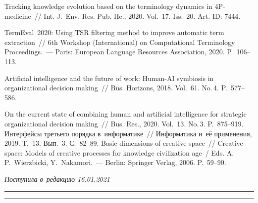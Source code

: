 \begin{multicols}{2}
{{\begin{thebibliography}{99}
 Tracking knowledge 
evolution based on the terminology dynamics in 4P-medicine~// Int. J.~Env. Res.
Pub. He., 2020. Vol.~17. Iss.~20. Art. ID: 7444.

 TermEval~2020: Using TSR filtering method to 
improve automatic term extraction~// 6th Workshop (International) on Computational 
Terminology Proceedings.~--- Paris: European Language Resources 
Association, 2020. P.~106--113.

\pagebreak

 Artificial intelligence and the future of work: Human-AI symbiosis in 
organizational decision making~// Bus. Horizons, 2018. Vol.~61. No.\,4. P.~577--586.



 On the current state of combining human and artificial 
intelligence for strategic organizational decision making~// Bus. Res., 2020. Vol.~13. 
No.\,3. P.~875--919.
 Интерфейсы третьего порядка в~информатике~// Информатика и~её 
применения, 2019. Т.~13. Вып.~3. С.~82--89.
 Basic dimensions of creative space~// Creative space: 
Models of creative processes for knowledge civilization age~/ Eds. A.\,P.~Wierzbicki, 
Y.~Nakamori.~--- Berlin: Springer Verlag, 2006. P.~59--90.
\end{thebibliography}

}
}

\end{multicols}

\vspace*{-3pt}

\hfill{\small\textit{Поступила в~редакцию 16.01.2021}}

\vspace*{8pt}




\hrule

\vspace*{2pt}

\hrule


\def\tit{PROBLEM-ORIENTED UPDATING OF DICTIONARY ENTRIES OF~BILINGUAL 
DICTIONARIES AND~MEDICAL TERMINOLOGY: COMPARATIVE ANALYSIS}

